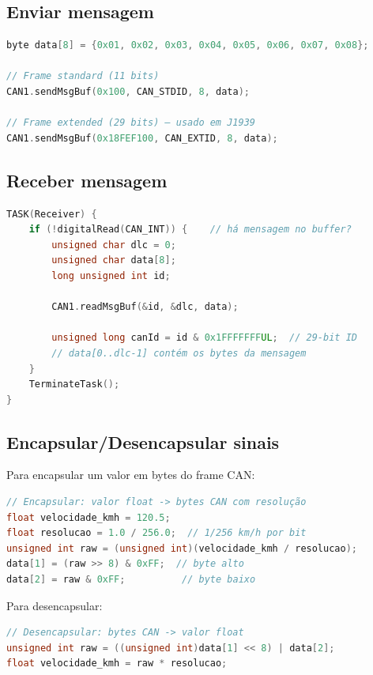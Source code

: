 \documentclass[12pt,a4paper]{article}
\begin{document}
\subsection{Enviar mensagem}

\begin{lstlisting}[language=C++]
byte data[8] = {0x01, 0x02, 0x03, 0x04, 0x05, 0x06, 0x07, 0x08};

// Frame standard (11 bits)
CAN1.sendMsgBuf(0x100, CAN_STDID, 8, data);

// Frame extended (29 bits) — usado em J1939
CAN1.sendMsgBuf(0x18FEF100, CAN_EXTID, 8, data);
\end{lstlisting}

\subsection{Receber mensagem}

\begin{lstlisting}[language=C++]
TASK(Receiver) {
    if (!digitalRead(CAN_INT)) {    // há mensagem no buffer?
        unsigned char dlc = 0;
        unsigned char data[8];
        long unsigned int id;

        CAN1.readMsgBuf(&id, &dlc, data);

        unsigned long canId = id & 0x1FFFFFFFUL;  // 29-bit ID
        // data[0..dlc-1] contém os bytes da mensagem
    }
    TerminateTask();
}
\end{lstlisting}

\subsection{Encapsular/Desencapsular sinais}

Para encapsular um valor em bytes do frame CAN:

\begin{lstlisting}[language=C++]
// Encapsular: valor float -> bytes CAN com resolução
float velocidade_kmh = 120.5;
float resolucao = 1.0 / 256.0;  // 1/256 km/h por bit
unsigned int raw = (unsigned int)(velocidade_kmh / resolucao);
data[1] = (raw >> 8) & 0xFF;  // byte alto
data[2] = raw & 0xFF;          // byte baixo
\end{lstlisting}

Para desencapsular:

\begin{lstlisting}[language=C++]
// Desencapsular: bytes CAN -> valor float
unsigned int raw = ((unsigned int)data[1] << 8) | data[2];
float velocidade_kmh = raw * resolucao;
\end{lstlisting}
\end{document}
